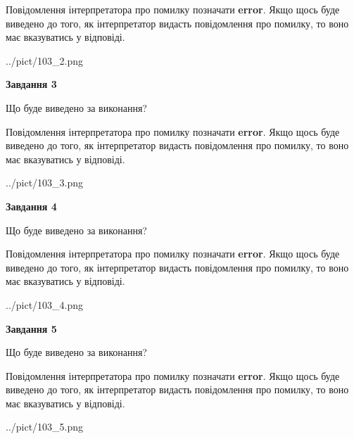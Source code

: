 \documentclass[12pt, ukrainian]{article}
\begin{document}
{\begin {large}
Повідомлення інтерпретатора про помилку позначати \textbf{error}.
Якщо щось буде виведено до того, як інтерпретатор видасть повідомлення про помилку, 
то воно має вказуватись у відповіді. \par


\begin{center}
	{../pict/103_2.png}
\end{center}
\newpage

{\begin {center}\textbf{Завдання 3}\end {center}}\par
Що буде виведено за виконання?

Повідомлення інтерпретатора про помилку позначати \textbf{error}.
Якщо щось буде виведено до того, як інтерпретатор видасть повідомлення про помилку, 
то воно має вказуватись у відповіді. \par


\begin{center}
	{../pict/103_3.png}
\end{center}
\newpage

{\begin {center}\textbf{Завдання 4}\end {center}}\par
Що буде виведено за виконання?

Повідомлення інтерпретатора про помилку позначати \textbf{error}.
Якщо щось буде виведено до того, як інтерпретатор видасть повідомлення про помилку, 
то воно має вказуватись у відповіді. \par


\begin{center}
	{../pict/103_4.png}
\end{center}
\newpage

{\begin {center}\textbf{Завдання 5}\end {center}}\par
Що буде виведено за виконання?

Повідомлення інтерпретатора про помилку позначати \textbf{error}.
Якщо щось буде виведено до того, як інтерпретатор видасть повідомлення про помилку, 
то воно має вказуватись у відповіді. \par


\begin{center}
	{../pict/103_5.png}
\end{center}
\newpage


\end{large}}
\end{document}
